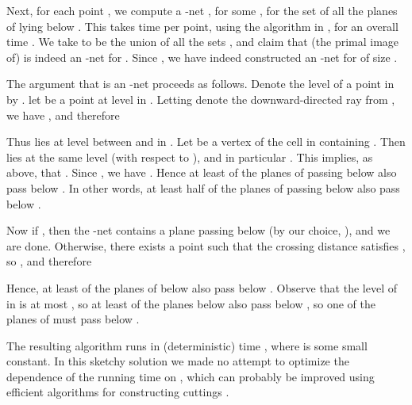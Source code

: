 \documentclass[12pt]{article}
\begin{document}
Next, for each point , we compute a -net , for
some , for the set  of all the planes of  lying
below . This takes  time per point, using the
algorithm in \cite{m-dcg-96}, for an overall time .
We take  to be the union of all the sets , and claim that (the
primal image of)  is indeed an -net for . Since
, we have indeed constructed an -net
for  of size .

The argument that  is an -net proceeds as follows.
Denote the level of a point  in  by .
let  be a point at level  in .
Letting  denote the downward-directed ray from , we have
, and therefore

Thus  lies at level between  and 
in . Let  be a vertex of the cell in  containing
. Then  lies at the same level (with respect to ), and in particular .
This implies, as above, that .
Since , we have . Hence at
least  of the planes of  passing below  also pass
below . In other words, at least half of the  planes
of  passing below  also pass below .

Now if , then the -net  contains a plane
passing below  (by our choice, ), and we are done.
Otherwise, there exists a point  such that the crossing
distance  satisfies ,
so , and therefore

Hence, at least  of the planes of  below  also
pass below . Observe that the level of  in  is at
most , so
at least  of the planes below  also
pass below , so one of the planes of  must pass below .

The resulting algorithm runs in (deterministic) time
, where  is some small constant. In this sketchy
solution we made no attempt to optimize the dependence of the running
time on , which can probably be improved using
efficient algorithms for constructing cuttings \cite{m-ept-92}.


\providecommand{\CNFX}[1]{ {\em{\textrm{(#1)}}}}
  \providecommand{\CNFSoCG}{\CNFX{SoCG}}  
\end{document}
